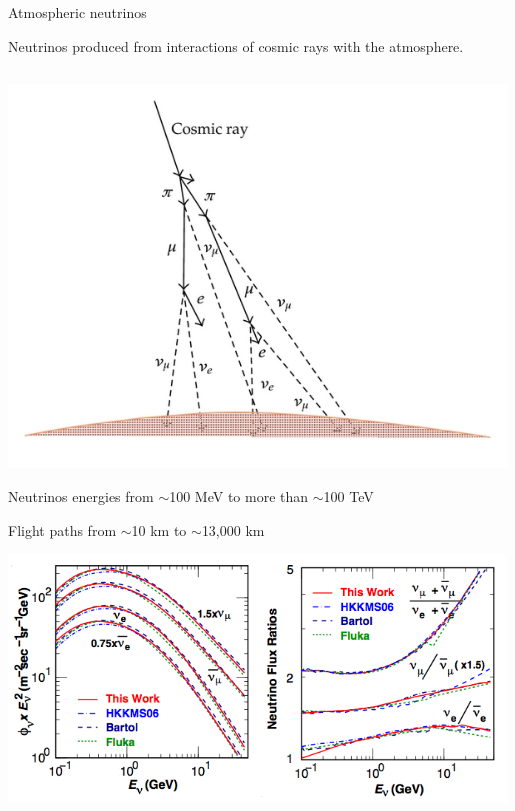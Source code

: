 %
%
%

\begin{frame}[t]{Atmospheric neutrinos}

{\small
\centering
Neutrinos produced from interactions of cosmic rays with the atmosphere.\\
}
\vspace{0.1cm}
\begin{columns}
  \begin{column}{0.64\textwidth}
    \begin{minipage}{0.48\linewidth}
       \includegraphics[width=0.99\textwidth]{./images/3nu/atmo/flux_schematic.png}\\
    \end{minipage}\hfill
    \begin{minipage}{0.48\linewidth}
       \begin{itemize}
       {\scriptsize
         \item Neutrinos energies from $\sim$100 MeV to more than $\sim$100 TeV
         \item Flight paths from $\sim$10 km to $\sim$13,000 km\\
       }
       \end{itemize}
    \end{minipage}
    \includegraphics[width=0.99\textwidth]{./images/3nu/atmo/flux_energy_spectrum_and_ratio.png}

\end{column}
\end{columns}
\end{frame}
